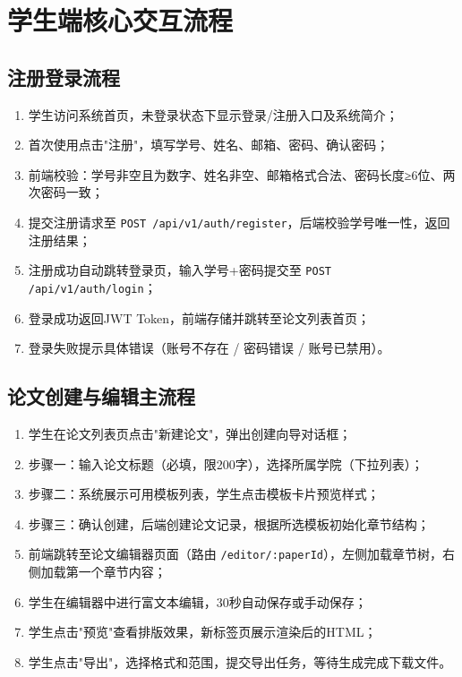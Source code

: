 \documentclass{../softeng}
\begin{document}

\section{学生端核心交互流程}

\subsection{注册登录流程}

\begin{enumerate}
    \item 学生访问系统首页，未登录状态下显示登录/注册入口及系统简介；
    \item 首次使用点击"注册"，填写学号、姓名、邮箱、密码、确认密码；
    \item 前端校验：学号非空且为数字、姓名非空、邮箱格式合法、密码长度≥6位、两次密码一致；
    \item 提交注册请求至 \texttt{POST /api/v1/auth/register}，后端校验学号唯一性，返回注册结果；
    \item 注册成功自动跳转登录页，输入学号+密码提交至 \texttt{POST /api/v1/auth/login}；
    \item 登录成功返回JWT Token，前端存储并跳转至论文列表首页；
    \item 登录失败提示具体错误（账号不存在 / 密码错误 / 账号已禁用）。
\end{enumerate}

\subsection{论文创建与编辑主流程}

\begin{enumerate}
    \item 学生在论文列表页点击"新建论文"，弹出创建向导对话框；
    \item 步骤一：输入论文标题（必填，限200字），选择所属学院（下拉列表）；
    \item 步骤二：系统展示可用模板列表，学生点击模板卡片预览样式；
    \item 步骤三：确认创建，后端创建论文记录，根据所选模板初始化章节结构；
    \item 前端跳转至论文编辑器页面（路由 \texttt{/editor/:paperId}），左侧加载章节树，右侧加载第一个章节内容；
    \item 学生在编辑器中进行富文本编辑，30秒自动保存或手动保存；
    \item 学生点击"预览"查看排版效果，新标签页展示渲染后的HTML；
    \item 学生点击"导出"，选择格式和范围，提交导出任务，等待生成完成下载文件。
\end{enumerate}
\end{document}

